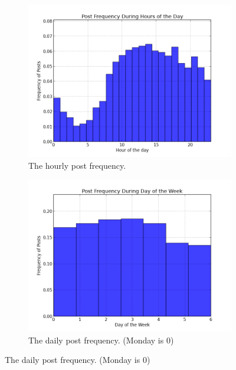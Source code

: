 \begin{figure}
\begin{center}
\begin{subfigure}[b]{0.45\textwidth}
\includegraphics[width=\textwidth]{diagrams/hoursofday.png}
\caption{The hourly post frequency.}
\label{fig:hr_freq}
	\end{subfigure}
	\begin{subfigure}[b]{0.45\textwidth}
\includegraphics[width=\textwidth]{diagrams/daysofweek.png}
\caption{The daily post frequency. (Monday is 0)}
\label{fig:week_freq}
	\end{subfigure}
\end{center}
\end{figure}

